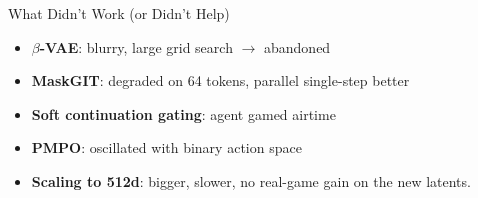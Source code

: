 \documentclass[aspectratio=169]{beamer}
\begin{document}
\begin{frame}{What Didn't Work (or Didn't Help)}
  \vspace{0.5em}
  \begin{itemize}
    \item \textbf{$\beta$-VAE}: blurry, large grid search $\to$ abandoned
    \item \textbf{MaskGIT}: degraded on 64 tokens, parallel single-step better
    \item \textbf{Soft continuation gating}: agent gamed airtime
    \item \textbf{PMPO}: oscillated with binary action space
    \item \textbf{Scaling to 512d}: bigger, slower, no real-game gain on the new latents.
  \end{itemize}
\end{frame}
\end{document}
